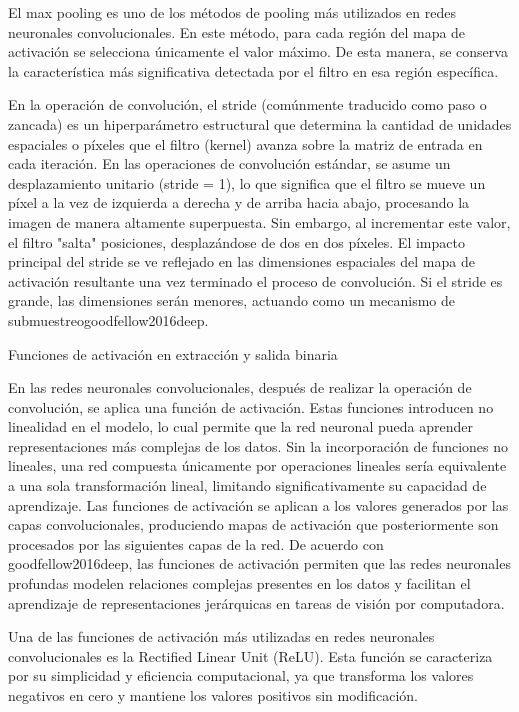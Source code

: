 El max pooling es uno de los métodos de pooling más utilizados en redes neuronales convolucionales. En este método, para cada región del mapa de activación se selecciona únicamente el valor máximo. De esta manera, se conserva la característica más significativa detectada por el filtro en esa región específica.

En la operación de convolución, el stride (comúnmente traducido como paso o zancada) es un hiperparámetro estructural que determina la cantidad de unidades espaciales o píxeles que el filtro (kernel) avanza sobre la matriz de entrada en cada iteración.
En las operaciones de convolución estándar, se asume un desplazamiento unitario (stride = 1), lo que significa que el filtro se mueve un píxel a la vez de izquierda a derecha y de arriba hacia abajo, procesando la imagen de manera altamente superpuesta. Sin embargo, al incrementar este valor, el filtro "salta" posiciones, desplazándose de dos en dos píxeles.
El impacto principal del stride se ve reflejado en las dimensiones espaciales del mapa de activación resultante una vez terminado el proceso de convolución. Si el stride es grande, las dimensiones serán menores, actuando como un mecanismo de submuestreogoodfellow2016deep.

Funciones de activación en extracción y salida binaria

En las redes neuronales convolucionales, después de realizar la operación de convolución, se aplica una función de activación. Estas funciones introducen no linealidad en el modelo, lo cual permite que la red neuronal pueda aprender representaciones más complejas de los datos. Sin la incorporación de funciones no lineales, una red compuesta únicamente por operaciones lineales sería equivalente a una sola transformación lineal, limitando significativamente su capacidad de aprendizaje.
Las funciones de activación se aplican a los valores generados por las capas convolucionales, produciendo mapas de activación que posteriormente son procesados por las siguientes capas de la red. De acuerdo con goodfellow2016deep, las funciones de activación permiten que las redes neuronales profundas modelen relaciones complejas presentes en los datos y facilitan el aprendizaje de representaciones jerárquicas en tareas de visión por computadora.

Una de las funciones de activación más utilizadas en redes neuronales convolucionales es la Rectified Linear Unit (ReLU). Esta función se caracteriza por su simplicidad y eficiencia computacional, ya que transforma los valores negativos en cero y mantiene los valores positivos sin modificación.

